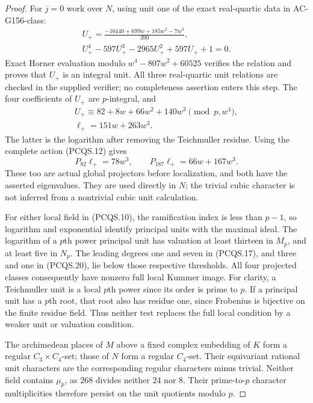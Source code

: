 \begin{proof}
For $j=0$ work over $N$, using unit one of the exact real-quartic
data in AC-G156-class:
\[
 \begin{gathered}
 U_+=\frac{-16440+699w+185w^2-7w^3}{390},\\
 U_+^4-597U_+^3-2965U_+^2+597U_++1=0.
 \end{gathered}
 \tag{PCQS.18}
\]
Exact Horner evaluation modulo $w^4-807w^2+60525$ verifies the
relation and proves that $U_+$ is an integral unit.
All three real-quartic unit relations are checked in the supplied
verifier; no completeness assertion enters this step.
The four coefficients of $U_+$ are $p$-integral, and
\[
 \begin{gathered}
 U_+\equiv82+8w+66w^2+140w^3\pmod{p,w^4},\\
                  \ell_+=151w+263w^3.
 \end{gathered}
 \tag{PCQS.19}
\]
The latter is the logarithm after removing the Teichmuller residue.
Using the complete action (PCQS.12) gives
\[
                     P_{82}\ell_+=78w^3,\qquad
                     P_{187}\ell_+=66w+167w^3.
 \tag{PCQS.20}
\]
These too are actual global projectors before localization,
and both have the asserted eigenvalues.
They are used directly in $N$; the trivial cubic character is
not inferred from a nontrivial cubic unit calculation.

For either local field in (PCQS.10), the ramification index is
less than $p-1$, so logarithm and exponential identify principal
units with the maximal ideal.
The logarithm of a $p$th power principal unit has valuation at
least thirteen in $M_p$, and at least five in $N_p$.
The leading degrees one and seven in (PCQS.17), and three and
one in (PCQS.20), lie below those respective thresholds.
All four projected classes consequently have nonzero full
local Kummer image.
For clarity, a Teichmuller unit is a local $p$th power since its
order is prime to $p$.  If a principal unit has a $p$th root,
that root also has residue one, since Frobenius is bijective
on the finite residue field.
Thus neither test replaces the full local condition by a
weaker unit or valuation condition.

The archimedean places of $M$ above a fixed complex embedding of
$K$ form a regular $C_3\times C_4$-set; those of $N$ form a
regular $C_4$-set.
Their equivariant rational unit characters are the corresponding
regular characters minus trivial.
Neither field contains $\mu_p$, as $268$ divides neither
$24$ nor $8$.
Their prime-to-$p$ character multiplicities therefore persist
on the unit quotients modulo $p$.


\end{proof}
